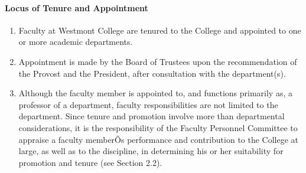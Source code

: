 \documentclass[letterpaper, 11pt]{article}
\begin{document}
			\paragraph{Locus of Tenure and Appointment}
				\begin{enumerate}[label=\alph*)]
					\item{Faculty at Westmont College are tenured to the College and appointed to one or more academic departments.}
					\item{Appointment is made by the Board of Trustees upon the recommendation of the Provost and the President, after consultation with the department(s).}
					\item{Although the faculty member is appointed to, and functions primarily as, a professor of a department, faculty responsibilities are not limited to the department.  Since tenure and promotion involve more than departmental considerations, it is the responsibility of the Faculty Personnel Committee to appraise a faculty memberÕs performance and contribution to the College at large, as well as to the discipline, in determining his or her suitability for promotion and tenure (see Section 2.2).}
				\end{enumerate}
\end{document}
